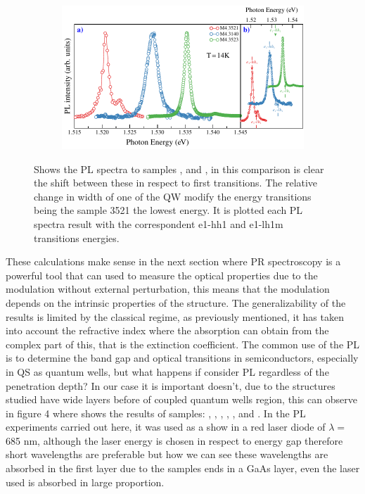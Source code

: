 \begin{figure}[H]
	\centering
	\begin{subfigure}{\textwidth}
		\includegraphics[width=\textwidth]{../figures/chapter-3/pl-plots/build/pl-2}
		\label{subfig:chapter-3-PL-experiments-M4_3140-M4_3521-M4_3523-a)}
		\label{subfig:chapter-3-PL-experiments-M4_3140-M4_3521-M4_3523-b)}
	\end{subfigure}
	\caption{ Shows the PL spectra to samples ,  and , in this comparison is clear the shift  between these in respect to first transitions. The relative change in width of one of the QW modify the  energy transitions being the sample 3521 the lowest energy.  It is plotted  each PL spectra result with the correspondent e1-hh1 and e1-lh1m transitions energies. }
	\label{fig:chapter-3-PL-experiments-M4_3140-M4_3521-M4_3523}
\end{figure}

These calculations make sense in the next section where PR spectroscopy is a powerful tool that can used to measure the optical properties due to the modulation without external perturbation, this means that the modulation depends on the intrinsic properties of the structure. The generalizability of the results is limited by the classical regime, as previously mentioned, it has taken into account the refractive index where the absorption can obtain from the complex part of this,  that is the extinction coefficient. The common use of the PL is to determine the band gap and optical transitions in semiconductors, especially in QS as quantum wells, but what happens if consider PL regardless of the penetration depth? 
In our case it is important doesn't, due to the structures studied have wide layers before of coupled quantum wells region, this can observe in figure 4 where shows the results of samples: , , , , , and .  In the PL experiments carried out here,  it was used as a show in  a red laser diode 
of  $\lambda=$685 nm, although the laser energy is chosen in respect to energy gap therefore short wavelengths are preferable but how we can see these wavelengths are absorbed in the first layer due to the samples ends in a GaAs layer, even the laser used is absorbed in large proportion. 

